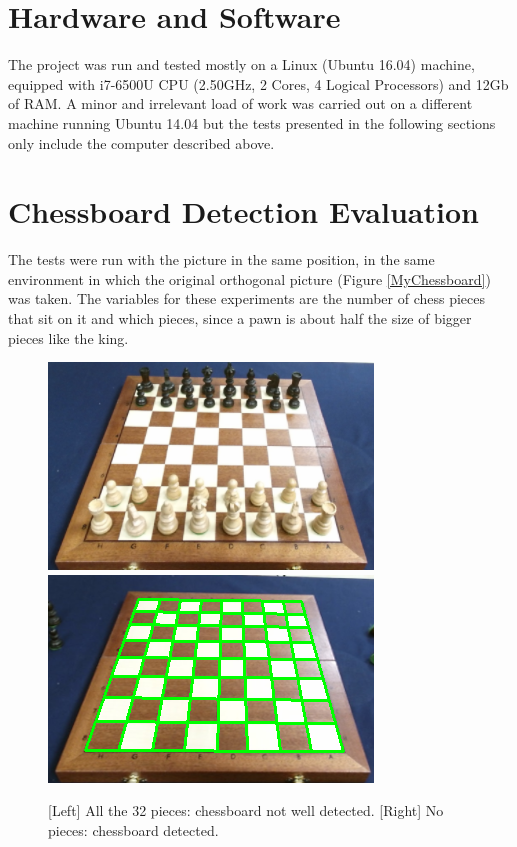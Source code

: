 \documentclass{l4proj}
\begin{document}
\section{Hardware and Software}

The project was run and tested mostly on a Linux (Ubuntu 16.04) machine, equipped with i7-6500U CPU (2.50GHz, 2 Cores, 4 Logical Processors) and 12Gb of RAM. A minor and irrelevant load of work was carried out on a different machine running Ubuntu 14.04 but the tests presented in the following sections only include the computer described above.


\section{Chessboard Detection Evaluation} \label{ChessboardDetectionEvaluation}

The tests were run with the picture in the same position, in the same environment in which the original orthogonal picture (Figure \ref{MyChessboard}) was taken. The variables for these experiments are the number of chess pieces that sit on it and which pieces, since a pawn is about half the size of bigger pieces like the king.

\vspace*{30mm}
\begin{figure}[h!]
\includegraphics[scale=0.75]{tb0.png} \includegraphics[scale=0.75]{1tb1.png}
\caption{[Left] All the 32 pieces: chessboard not well detected. [Right] No pieces: chessboard detected.}
\label{tb01}
\end{figure}
\end{document}
